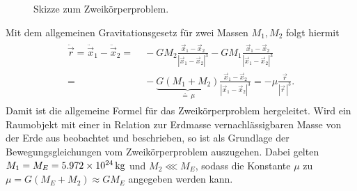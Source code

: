 \documentclass[a4paper,12pt]{article}
\numberwithin{equation}{section}
\begin{document}
\begin{figure}[h]

\caption{Skizze zum Zweikörperproblem.}
\label{fig:twobodyproblem}
\end{figure}
Mit dem allgemeinen Gravitationsgesetz für zwei Massen $M_1, M_2$ folgt hiermit \begin{align}\begin{aligned}
    \ddot{\vec{r}}= \ddot{\vec{x}}_1 - \ddot{\vec{x}}_2 =& \; -GM_2\frac{\vec{x}_1-\vec{x}_2}{|\vec{x}_1-\vec{x}_2|^3} - GM_1\frac{\vec{x}_1-\vec{x}_2}{|\vec{x}_1-\vec{x}_2|^3}  \\ =& \; -\underbrace{G(M_1 + M_2)}_{\doteq\, \mu}\frac{\vec{x}_1-\vec{x}_2}{|\vec{x}_1-\vec{x}_2|^3} = -\mu \frac{\vec{r}}{|\vec{r}\,|^3}.
\end{aligned}\end{align}
Damit ist die allgemeine Formel für das Zweikörperproblem hergeleitet. Wird ein Raumobjekt mit einer in Relation zur Erdmasse vernachlässigbaren Masse von der Erde aus beobachtet und beschrieben, so ist als Grundlage der Bewegungsgleichungen vom Zweikörperproblem auszugehen. Dabei gelten $M_1 = M_E = \SI{5.972E24}{\kilogram}$ und $M_2 \lll M_E$, sodass die Konstante $\mu$ zu $\mu = G(M_E + M_2) \approx GM_E$ angegeben werden kann.
\end{document}
